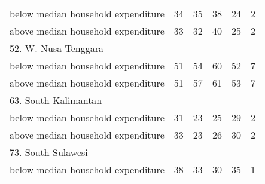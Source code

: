 \begin{table}[!h]
\begin{tabular}{llllll}
\multicolumn{1}{l}{\hspace{1em}below median household expenditure} &
  \multicolumn{1}{|r}{34} &
  \multicolumn{1}{r}{35} &
  \multicolumn{1}{r}{38} &
  \multicolumn{1}{r}{24} &
  \multicolumn{1}{r}{2} \\
\multicolumn{1}{l}{\hspace{1em}above median household expenditure} &
  \multicolumn{1}{|r}{33} &
  \multicolumn{1}{r}{32} &
  \multicolumn{1}{r}{40} &
  \multicolumn{1}{r}{25} &
  \multicolumn{1}{r}{2} \\
\multicolumn{1}{l}{52. W. Nusa Tenggara} &
  \multicolumn{1}{|r}{} &
  \multicolumn{1}{r}{} &
  \multicolumn{1}{r}{} &
  \multicolumn{1}{r}{} &
  \multicolumn{1}{r}{} \\
\multicolumn{1}{l}{\hspace{1em}below median household expenditure} &
  \multicolumn{1}{|r}{51} &
  \multicolumn{1}{r}{54} &
  \multicolumn{1}{r}{60} &
  \multicolumn{1}{r}{52} &
  \multicolumn{1}{r}{7} \\
\multicolumn{1}{l}{\hspace{1em}above median household expenditure} &
  \multicolumn{1}{|r}{51} &
  \multicolumn{1}{r}{57} &
  \multicolumn{1}{r}{61} &
  \multicolumn{1}{r}{53} &
  \multicolumn{1}{r}{7} \\
\multicolumn{1}{l}{63. South Kalimantan} &
  \multicolumn{1}{|r}{} &
  \multicolumn{1}{r}{} &
  \multicolumn{1}{r}{} &
  \multicolumn{1}{r}{} &
  \multicolumn{1}{r}{} \\
\multicolumn{1}{l}{\hspace{1em}below median household expenditure} &
  \multicolumn{1}{|r}{31} &
  \multicolumn{1}{r}{23} &
  \multicolumn{1}{r}{25} &
  \multicolumn{1}{r}{29} &
  \multicolumn{1}{r}{2} \\
\multicolumn{1}{l}{\hspace{1em}above median household expenditure} &
  \multicolumn{1}{|r}{33} &
  \multicolumn{1}{r}{23} &
  \multicolumn{1}{r}{26} &
  \multicolumn{1}{r}{30} &
  \multicolumn{1}{r}{2} \\
\multicolumn{1}{l}{73. South Sulawesi} &
  \multicolumn{1}{|r}{} &
  \multicolumn{1}{r}{} &
  \multicolumn{1}{r}{} &
  \multicolumn{1}{r}{} &
  \multicolumn{1}{r}{} \\
\multicolumn{1}{l}{\hspace{1em}below median household expenditure} &
  \multicolumn{1}{|r}{38} &
  \multicolumn{1}{r}{33} &
  \multicolumn{1}{r}{30} &
  \multicolumn{1}{r}{35} &
  \multicolumn{1}{r}{1} \\

\end{tabular}
\end{table}
